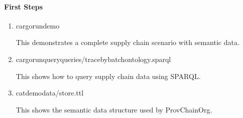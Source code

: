 \documentclass[letterpaper,10pt,english]{sphinxmanual}
\begin{document}
\paragraph{First Steps}
\label{\detokenize{foundational/intro-to-provchainorg:first-steps}}\begin{enumerate}
%
\item {} 
\sphinxAtStartPar
{}

\begin{sphinxVerbatim}[commandchars=\\\{\}]
cargorundemo
\end{sphinxVerbatim}

\sphinxAtStartPar
This demonstrates a complete supply chain scenario with semantic data.

\item {} 
\sphinxAtStartPar
{}

\begin{sphinxVerbatim}[commandchars=\\\{\}]
cargorun\PYGZhy{}\PYGZhy{}queryqueries/trace\PYGZus{}by\PYGZus{}batch\PYGZus{}ontology.sparql
\end{sphinxVerbatim}

\sphinxAtStartPar
This shows how to query supply chain data using SPARQL.

\item {} 
\sphinxAtStartPar
{}

\begin{sphinxVerbatim}[commandchars=\\\{\}]
catdemo\PYGZus{}data/store.ttl
\end{sphinxVerbatim}

\sphinxAtStartPar
This shows the semantic data structure used by ProvChainOrg.

\end{enumerate}
\end{document}
